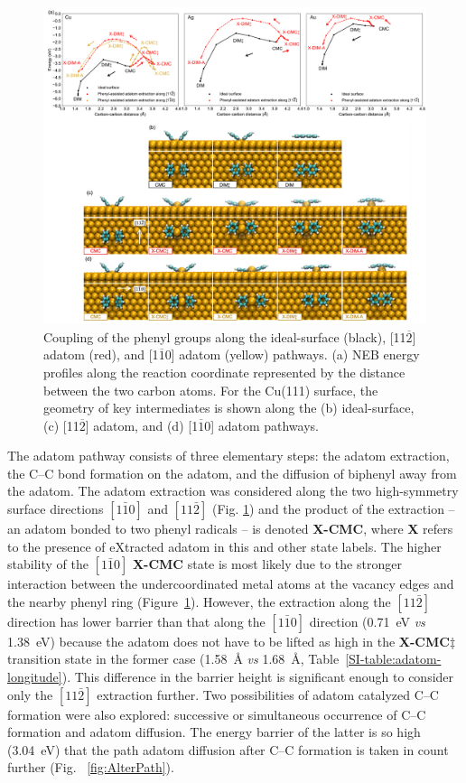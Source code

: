 \documentclass[aps,prb,amsmath,amssymb,11pt]{revtex4-1}
\newcommand{\zhzh}{\color{blue}}
\newcommand{\zhzh}{\color{blue}}
\begin{document}
\begin{figure}[bt]
\centering
\includegraphics[width=1.0\textwidth]{Fig/distance-energy.pdf}
\caption{Coupling of the phenyl groups along the ideal-surface (black),  [11$\overline{2}$] adatom (red), and  [1$\overline{1}$0] adatom (yellow) pathways. (a) NEB energy profiles along the reaction coordinate represented by the distance between the two carbon atoms. For the Cu(111) surface, the geometry of key intermediates is shown along the (b) ideal-surface, (c) [11$\overline{2}$] adatom, and (d) [1$\overline{1}$0] adatom pathways.}
\label{fig:distance-energy}
\end{figure}

The adatom pathway consists of three elementary steps: the adatom extraction, the C--C bond formation on the adatom, and the diffusion of biphenyl away from the adatom. 
The adatom extraction was considered along the two high-symmetry surface directions $[1\bar{1}0]$ and $[11\bar{2}]$ (Fig. \ref{fig:distance-energy}) and the product of the extraction -- an adatom bonded to two phenyl radicals -- is denoted \textbf{X-CMC}, where \textbf{X} refers to the presence of eXtracted adatom in this and other state labels. 
The higher stability of the $[1\bar{1}0]$ \textbf{X-CMC} state is most likely due to the stronger interaction between the undercoordinated metal atoms at the vacancy edges and the nearby phenyl ring (Figure~\ref{fig:distance-energy}).
However, the extraction along the $[11\bar{2}]$ direction has lower barrier than that along the $[1\bar{1}0]$ direction (\SI{0.71}{\electronvolt} \emph{vs} \SI{1.38}{\electronvolt}) because the adatom does not have to be lifted as high in the \textbf{X-CMC$\ddagger$} transition state in the former case (\SI{1.58}{\angstrom} \emph{vs} \SI{1.68}{\angstrom}, Table~\ref{SI-table:adatom-longitude}). This difference in the barrier height is significant enough to consider only the $[11\bar{2}]$ extraction further.
{\zhzh Two possibilities of adatom catalyzed C--C formation were also explored: successive or simultaneous occurrence of C--C formation and adatom diffusion. The energy barrier of the latter is so high (\SI{3.04}{\electronvolt}) that the path adatom diffusion after C--C formation is taken in count further (Fig. ~\ref{fig:AlterPath})}.
\end{document}
